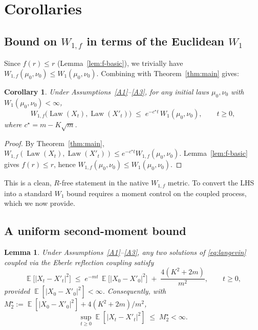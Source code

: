 \documentclass[11pt]{article}
\newtheorem{lemma}[theorem]{Lemma}
\newtheorem{corollary}[theorem]{Corollary}
\theoremstyle{definition}
\DeclareMathOperator{\E}{\mathbb{E}}
\DeclareMathOperator{\Law}{Law}
\newcommand{\abs}[1]{\left\lvert #1 \right\rvert}
\begin{document}
\section{Corollaries}\label{sec:corollaries}

\subsection{Bound on \texorpdfstring{$W_{1,f}$}{W1f} in terms of the Euclidean \texorpdfstring{$W_1$}{W1}}

Since $f(r) \le r$ (Lemma~\ref{lem:f-basic}), we trivially have $W_{1,f}(\mu_0,\nu_0) \le W_1(\mu_0,\nu_0)$. Combining with Theorem~\ref{thm:main} gives:

\begin{corollary}\label{cor:W1f-from-W1}
Under Assumptions~\ref{A1}--\ref{A3}, for any initial laws $\mu_0, \nu_0$ with $W_1(\mu_0,\nu_0) < \infty$,
\[
W_{1,f}\bigl(\Law(X_t),\Law(X'_t)\bigr) \;\le\; e^{-c^\star t}\,W_1(\mu_0,\nu_0), \qquad t \ge 0,
\]
where $c^\star = m - K\sqrt m$.
\end{corollary}

\begin{proof}
By Theorem~\ref{thm:main}, $W_{1,f}(\Law(X_t),\Law(X'_t)) \le e^{-c^\star t} W_{1,f}(\mu_0,\nu_0)$. Lemma~\ref{lem:f-basic} gives $f(r) \le r$, hence $W_{1,f}(\mu_0,\nu_0) \le W_1(\mu_0,\nu_0)$.
\end{proof}

This is a clean, $R$-free statement in the native $W_{1,f}$ metric. To convert the LHS into a standard $W_1$ bound requires a moment control on the coupled process, which we now provide.

\subsection{A uniform second-moment bound}

\begin{lemma}\label{lem:moment}
Under Assumptions~\ref{A1}--\ref{A3}, any two solutions of \eqref{eq:langevin} coupled via the Eberle reflection coupling satisfy
\[
\E\bigl[\abs{X_t - X'_t}^2\bigr] \;\le\; e^{-m t}\,\E\bigl[\abs{X_0 - X'_0}^2\bigr] \;+\; \frac{4(K^2 + 2 m)}{m^2}, \qquad t \ge 0,
\]
provided $\E[\abs{X_0 - X'_0}^2] < \infty$. Consequently, with $M_2^\star := \E[\abs{X_0-X'_0}^2] + 4(K^2+2m)/m^2$,
\[
\sup_{t \ge 0}\E[\abs{X_t - X'_t}^2] \;\le\; M_2^\star < \infty.
\]
\end{lemma}
\end{document}
